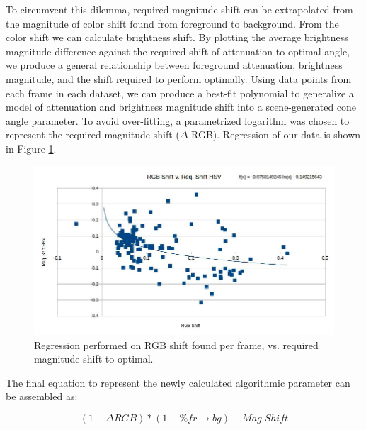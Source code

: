 \documentclass[12pt]{report}
\begin{document}
To circumvent this dilemma, required magnitude shift can be extrapolated from the magnitude of color shift found from foreground to background. From the color shift we can calculate brightness shift. By plotting the average brightness magnitude difference against the required shift of attenuation to optimal angle, we produce a general relationship between foreground attenuation, brightness magnitude, and the shift required to perform optimally. Using data points from each frame in each dataset, we can produce a best-fit polynomial to generalize a model of attenuation and brightness magnitude shift into a scene-generated cone angle parameter. To avoid over-fitting, a parametrized logarithm was chosen to represent the required magnitude shift ($\Delta$ RGB). Regression of our data is shown in Figure \ref{fig:polyfit}.

\begin{figure}
  \centering
  \includegraphics[width=1\linewidth]{figures/polyfit.jpg}
  \caption{Regression performed on RGB shift found per frame, vs. required magnitude shift to optimal.}
  \label{fig:polyfit}
\end{figure}

The final equation to represent the newly calculated algorithmic parameter can be assembled as:

\begin{equation}
(1 - \Delta RGB)*(1 - \%fr \rightarrow bg) + Mag. Shift
\end{equation}
\end{document}
